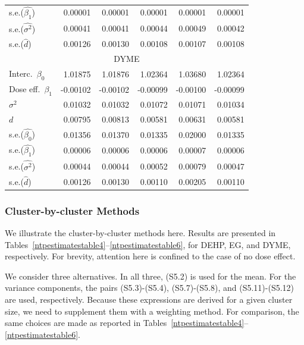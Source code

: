 \documentclass[11pt,a5paper,twoside]{book}
\begin{document}
\begin{table}[!t]
\begin{center}
\begin{tabular}{lrrrrr}
s.e.($\widehat{\beta_1}$) & 0.00001 & 0.00001 & 0.00001 & 0.00001 & 0.00001 \\
 s.e.($\widehat{\sigma^2}$) & 0.00041 & 0.00041 & 0.00044 & 0.00049 & 0.00042 \\
 s.e.($\widehat{d}$) & 0.00126 & 0.00130 & 0.00108 & 0.00107 & 0.00108 \\
\hline\hline
\multicolumn{6}{c}{{DYME}}\\
\hline
Interc.\ $\beta_0$& 1.01875 & 1.01876 & 1.02364 & 1.03680 & 1.02364 \\
 Dose eff.\ $\beta_1$ & -0.00102 & -0.00102 & -0.00099 & -0.00100 & -0.00099 \\
 $\sigma^2$ & 0.01032 & 0.01032 & 0.01072 & 0.01071 & 0.01034 \\
$d$ & 0.00795 & 0.00813 & 0.00581 & 0.00631 & 0.00581 \\
\hline
s.e.($\widehat{\beta_0}$) & 0.01356 & 0.01370 & 0.01335 & 0.02000 & 0.01335 \\
s.e.($\widehat{\beta_1}$) & 0.00006 & 0.00006 & 0.00006 & 0.00007 & 0.00006 \\
s.e.($\widehat{\sigma^2}$) & 0.00044 & 0.00044 & 0.00052 & 0.00079 & 0.00047 \\
 s.e.($\widehat{d}$) & 0.00126 & 0.00130 & 0.00110 & 0.00205 & 0.00110 \\
\hline\hline
\end{tabular}
\end{center}
\end{table}

\subsubsection{Cluster-by-cluster Methods}
\label{cbc}

We illustrate the cluster-by-cluster methods here. Results are 
presented in Tables~\ref{ntpestimatestable4}--\ref{ntpestimatestable6}, 
for DEHP, EG, and DYME, respectively. For brevity, attention here is 
confined to the case of no dose effect.

We consider three alternatives. In all three, (S5.2)
is used for the mean. For the variance components, 
the pairs (S5.3)-(S5.4), (S5.7)-(S5.8), and (S5.11)-(S5.12)
are used, respectively. Because 
these expressions are derived for a given cluster size, 
we need to supplement them with a weighting method. For comparison, the 
same choices are made as reported in Tables~\ref{ntpestimatestable4}--\ref{ntpestimatestable6}.
\end{document}
